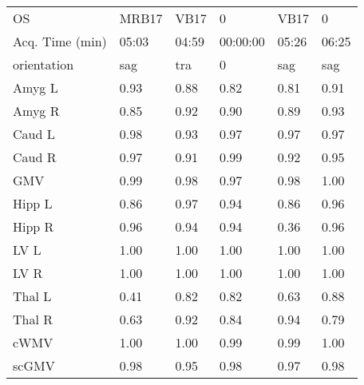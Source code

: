\begin{table}
\begin{tabular}{llllll}
OS                    &              MRB17 &               VB17 &                  0 &                                 VB17 &                  0 \\
Acq. Time (min)       &           05:03 &           04:59 &           00:00:00 &                             05:26 &           06:25 \\
orientation           &                sag &                tra &                  0 &                                  sag &                sag \\
\midrule
Amyg L                &               0.93 &               0.88 &               0.82 &                                 0.81 &               0.91 \\
Amyg R                &               0.85 &               0.92 &               0.90 &                                 0.89 &               0.93 \\
Caud L                &               0.98 &               0.93 &               0.97 &                                 0.97 &               0.97 \\
Caud R                &               0.97 &               0.91 &               0.99 &                                 0.92 &               0.95 \\
GMV                   &               0.99 &               0.98 &               0.97 &                                 0.98 &               1.00 \\
Hipp L                &               0.86 &               0.97 &               0.94 &                                 0.86 &               0.96 \\
Hipp R                &               0.96 &               0.94 &               0.94 &                                 0.36 &               0.96 \\
LV L                  &               1.00 &               1.00 &               1.00 &                                 1.00 &               1.00 \\
LV R                  &               1.00 &               1.00 &               1.00 &                                 1.00 &               1.00 \\
Thal L                &               0.41 &               0.82 &               0.82 &                                 0.63 &               0.88 \\
Thal R                &               0.63 &               0.92 &               0.84 &                                 0.94 &               0.79 \\
cWMV                  &               1.00 &               1.00 &               0.99 &                                 0.99 &               1.00 \\
scGMV                 &               0.98 &               0.95 &               0.98 &                                 0.97 &               0.98 \\
\bottomrule
\end{tabular}


\end{table}

